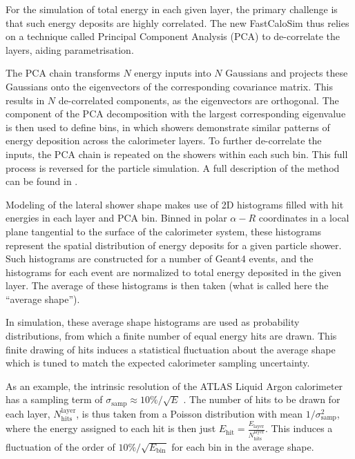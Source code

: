 For the simulation of total energy in each given layer, the primary challenge is that such energy deposits are highly correlated. The new FastCaloSim thus relies on a technique called Principal Component Analysis (PCA)  to de-correlate the layers, aiding parametrisation.

The PCA chain transforms $N$ energy inputs into $N$ Gaussians and projects these Gaussians onto the eigenvectors of the corresponding covariance matrix. This results in $N$ de-correlated components, as the eigenvectors are orthogonal. The component of the PCA decomposition with the largest corresponding eigenvalue is then used to define bins, in which showers demonstrate similar patterns of energy deposition across the calorimeter layers. To further de-correlate the inputs, the PCA chain is repeated on the showers within each such bin. This full process is reversed for the particle simulation. A full description of the method can be found in \cite{ATL-SOFT-PUB-2018-002}.

Modeling of the lateral shower shape makes use of 2D histograms filled with \GEANT hit energies in each layer and PCA bin.
Binned in polar $\alpha-R$ coordinates in a local plane tangential to the surface of the calorimeter system, these histograms 
represent the spatial distribution of energy deposits for a given particle shower. Such histograms are constructed for a 
number of Geant4 events, and the histograms for each event are normalized to total energy deposited in the given layer. The 
average of these histograms is then taken (what is called here the ``average shape'').

In simulation, these average shape histograms are used as probability distributions, from which a finite number of equal 
energy hits are drawn. This finite drawing of hits induces a statistical fluctuation about the average shape which is tuned 
to match the expected calorimeter sampling uncertainty.

As an example, the intrinsic resolution of the ATLAS Liquid Argon calorimeter has a sampling term of 
$\sigma_{\text{samp}} \approx 10\%/\sqrt{E}$ \cite{SamplingCalo}. The number of hits to be drawn for each layer, 
$N_{\text{hits}}^{\text{layer}}$, is thus taken from a Poisson distribution with mean $1/\sigma_{\text{samp}}^2$, where the 
energy assigned to each hit is then just $E_{\text{hit}} = \frac{E_{\text{layer}}}{N_{\text{hits}}^{\text{layer}}}$. This 
induces a fluctuation of the order of $10\%/\sqrt{E_{\text{bin}}}$ for each bin in the average shape.

